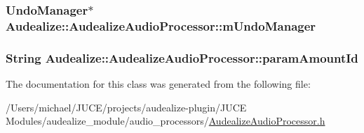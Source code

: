 \subsubsection[{\texorpdfstring{m\+Undo\+Manager}{mUndoManager}}]{\setlength{\rightskip}{0pt plus 5cm}Undo\+Manager$\ast$ Audealize\+::\+Audealize\+Audio\+Processor\+::m\+Undo\+Manager\hspace{0.3cm}{\ttfamily [protected]}}\hypertarget{class_audealize_1_1_audealize_audio_processor_aad11b053db8e6f9ae61afa610126b23d}{}\label{class_audealize_1_1_audealize_audio_processor_aad11b053db8e6f9ae61afa610126b23d}
\subsubsection[{\texorpdfstring{param\+Amount\+Id}{paramAmountId}}]{\setlength{\rightskip}{0pt plus 5cm}String Audealize\+::\+Audealize\+Audio\+Processor\+::param\+Amount\+Id\hspace{0.3cm}{\ttfamily [protected]}}\hypertarget{class_audealize_1_1_audealize_audio_processor_a8c51332f043fbb80c2fa573a7f753c8a}{}\label{class_audealize_1_1_audealize_audio_processor_a8c51332f043fbb80c2fa573a7f753c8a}


The documentation for this class was generated from the following file\+:\begin{DoxyCompactItemize}
\item 
/\+Users/michael/\+J\+U\+C\+E/projects/audealize-\/plugin/\+J\+U\+C\+E Modules/audealize\+\_\+module/audio\+\_\+processors/\hyperlink{_audealize_audio_processor_8h}{Audealize\+Audio\+Processor.\+h}\end{DoxyCompactItemize}
